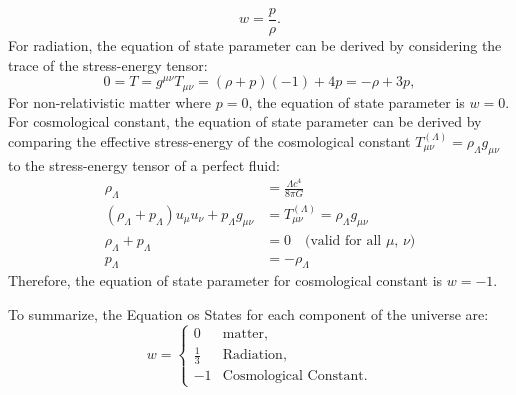 \begin{equation}
    w = \frac{p}{\rho}.
    \label{eq:equation_of_state}
\end{equation}
For radiation, the equation of state parameter can be derived by considering the trace of the stress-energy tensor:
\begin{equation}
    0 = T = g^{\mu\nu} T_{\mu\nu} = (\rho + p)(-1) + 4p = -\rho + 3p,
    \label{eq:stress_energy_trace}
\end{equation}
For non-relativistic matter where $p = 0$, the equation of state parameter is \( w = 0 \). 
For cosmological constant, the equation of state parameter can be derived by comparing the effective stress-energy of the cosmological constant $T_{\mu\nu}^{(\Lambda)} = \rho_{\Lambda} g_{\mu\nu}$ to the stress-energy tensor of a perfect fluid:
\begin{align}
    \rho_{\Lambda} &= \frac{\Lambda c^4}{8\pi G} \label{eq:lambda_density} \\
    \left(\rho_{\Lambda} + p_{\Lambda} \right) u_{\mu} u_{\nu} + p_{\Lambda} g_{\mu\nu} &= T_{\mu\nu}^{(\Lambda)} = \rho_{\Lambda} g_{\mu\nu}  \\
    \rho_{\Lambda} + p_{\Lambda} &= 0 \quad \text{(valid for all $\mu$, $\nu$)} \nonumber \\
    p_{\Lambda} &= -\rho_{\Lambda} \label{eq:lambda_pressure}
\end{align}
Therefore, the equation of state parameter for cosmological constant is \( w = -1 \).

To summarize, the Equation os States for each component of the universe are:
\begin{equation}
    w = 
    \begin{cases}
        0 & \text{matter}, \\
        \frac{1}{3} & \text{Radiation}, \\
        -1 & \text{Cosmological Constant}.
    \end{cases}
    \label{eq:equation_of_state_summary}
\end{equation}

